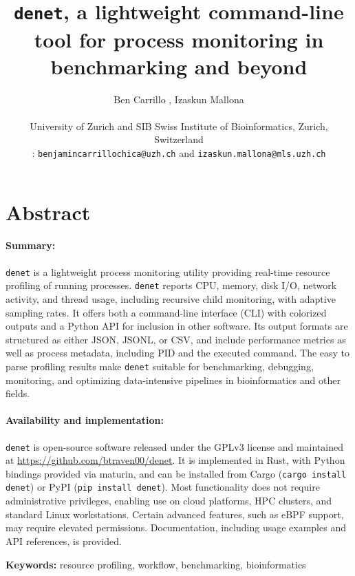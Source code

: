 \documentclass[10pt]{article}
\title{\texttt{denet}, a lightweight command-line tool for process monitoring in benchmarking and beyond}
\author{Ben Carrillo \orcidlink{0009-0003-5704-4151}, Izaskun Mallona \orcidlink{0000-0002-2853-7526}\\
\\
University of Zurich and SIB Swiss Institute of Bioinformatics, Zurich, Switzerland \\ 
{ \Letter: \texttt{benjamincarrillochica@uzh.ch} and \texttt{izaskun.mallona@mls.uzh.ch}}
}
\date{}
\begin{document}
\maketitle
	
\section*{Abstract} %

\paragraph{Summary:} \texttt{denet} is a lightweight process monitoring utility providing real-time resource profiling of running processes. \texttt{denet} reports CPU, memory, disk I/O, network activity, and thread usage, including recursive child monitoring, with adaptive sampling rates. It offers both a command-line interface (CLI) with colorized outputs and a Python API for inclusion in other software. Its output formats are structured as either JSON, JSONL, or CSV, and include performance metrics as well as process metadata, including PID and the executed command. The easy to parse profiling results make \texttt{denet} suitable for benchmarking, debugging, monitoring, and optimizing data-intensive pipelines in bioinformatics and other fields. 

\paragraph{Availability and implementation:} \texttt{denet} is open-source software released under the GPLv3 license and maintained at \url{https://github.com/btraven00/denet}. It is implemented in Rust, with Python bindings provided via maturin, and can be installed from Cargo (\texttt{cargo install denet}) or PyPI (\texttt{pip install denet}). Most functionality does not require administrative privileges, enabling use on cloud platforms, HPC clusters, and standard Linux workstations. Certain advanced features, such as eBPF support, may require elevated permissions. Documentation, including usage examples and API references, is provided.

\vspace{0.5cm}

\noindent\textbf{Keywords:} resource profiling, workflow, benchmarking, bioinformatics

\end{document}
